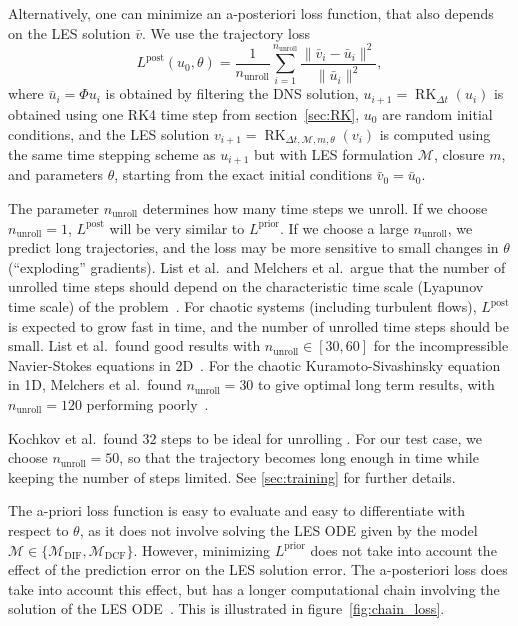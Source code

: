 \documentclass[preprint]{elsarticle}
\newcommand{\R}[1]{}
\newcommand{\revone}[1]{#1}
\begin{document}
Alternatively, one can minimize an a-posteriori loss function, that also depends
on the LES solution $\bar{v}$. We use the trajectory loss
\begin{equation} \label{eq:Lpost}
    L^\text{post}(u_0, \theta) =
    \frac{1}{n_\text{unroll}} 
    \sum_{i = 1}^{n_\text{unroll}}
    \frac{\|\bar{v}_i - \bar{u}_i\|^2}{\|\bar{u}_i\|^2},
\end{equation}
where $\bar{u}_i = \Phi u_i$ is obtained by filtering the DNS solution, $u_{i +
1} = \operatorname{RK}_{\Delta t}(u_i)$ is obtained using one RK4 time step from
section~\ref{sec:RK}, $u_0$ are random initial conditions, and the LES solution
$v_{i + 1} = \operatorname{RK}_{\Delta t, \mathcal{M}, m, \theta}(v_i)$ is
computed using the same time stepping scheme as $u_{i + 1}$ but with LES
formulation $\mathcal{M}$, closure $m$, and parameters $\theta$, starting from
the exact initial conditions $\bar{v}_0 = \bar{u}_0$.

The parameter $n_\text{unroll}$ determines how many time steps we unroll. If we
choose $n_\text{unroll} = 1$, $L^\text{post}$ will be very similar to
$L^\text{prior}$. If we choose a large $n_\text{unroll}$, we predict long
trajectories, and the loss may be more sensitive to small changes in $\theta$
(``exploding'' gradients). List et al.\ and Melchers et al.\ argue that the
number of unrolled time steps should depend on the characteristic time scale
(Lyapunov time scale) of the problem~\cite{List2022,Melchers2023}. For chaotic
systems (including turbulent flows), $L^\text{post}$ is expected to grow fast in
time, and the number of unrolled time steps should be small. List et al.\ found
good results with $n_\text{unroll} \in [30, 60]$ for the
incompressible Navier-Stokes equations in 2D~\cite{List2022}. For the chaotic
Kuramoto-Sivashinsky equation in 1D, Melchers et al.\ found $n_\text{unroll} =
30$ to give optimal long term results, with $n_\text{unroll} = 120$ performing
poorly~\cite{Melchers2023}.
\revone{
    \R{nunroll}
    Kochkov et al.\ found $32$ steps to be ideal for unrolling
    \cite{Kochkov2021}. For our test case, we choose $n_\text{unroll} = 50$, so
    that the trajectory becomes long enough in time while keeping the number of
    steps limited. See \ref{sec:training} for further details.
}

The a-priori loss function is easy to evaluate and easy to differentiate with
respect to $\theta$, as it does not involve solving the LES ODE given by the
model $\mathcal{M} \in \{
\mathcal{M}_{\text{DIF}},
\mathcal{M}_{\text{DCF}}
\}$. However, minimizing $L^\text{prior}$ does not take into account the effect
of the prediction error on the LES solution error. The a-posteriori loss does
take into account this effect, but has a longer computational chain involving
the solution of the LES ODE~\cite{Um2020,MacArt2021,List2022,List2024,Kohl2023}.
This is illustrated in figure~\ref{fig:chain_loss}.
\end{document}
